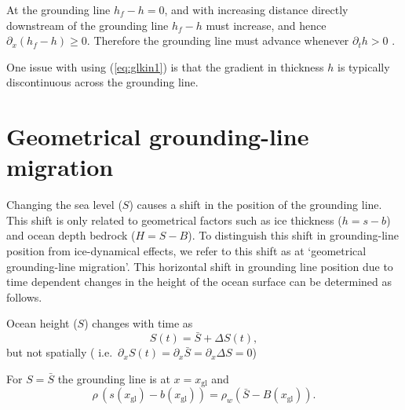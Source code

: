 \documentclass[10pt,a4paper]{book}
\newcommand{\p}{\partial}
\newcommand{\xgl}{x_{\mathrm{gl}}}
\begin{document}
At the grounding line $h_f-h=0$, and with increasing distance directly
downstream of the grounding line $h_f-h$ must increase, and hence
$\p_x (h_f -h) \ge 0$.  Therefore the grounding line must advance
whenever $\p_t h > 0$ .


One issue with using (\ref{eq:glkin1}) is that the gradient in
thickness $h$ is typically discontinuous across the grounding
line.


\section{Geometrical grounding-line migration}



Changing the sea level ($S$) causes a shift in the position of the
grounding line. This shift is only related to geometrical factors such
as ice thickness ($h=s-b$) and ocean depth bedrock ($H=S-B$). To
distinguish this shift in grounding-line position from ice-dynamical
effects, we refer to this shift as at `geometrical grounding-line
migration'. This horizontal shift in grounding line position due to
time dependent changes in the height of the ocean surface can be determined as
follows.


Ocean height ($S$) changes with time as
\[
S(t)=\bar{S}+\Delta S(t) ,
\]
but not spatially ( i.e.\ $\p_x S(t) = \p_x \bar{S} = \p_x \Delta S=0$) 

For $S=\bar{S}$ the grounding line is at  $x=\xgl$ and
\begin{equation}
\rho \, \left (s(\xgl)-b(\xgl) \right )=\rho_w (\bar{S}-B(\xgl)) .
\label{eq:mean}
\end{equation}

\end{document}
